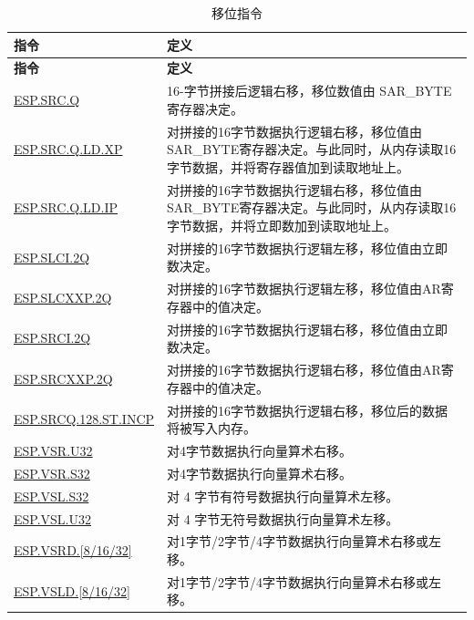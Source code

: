 \begin{longtable}[c]{|l|m{10cm}|}
    \caption{移位指令}
    \label{tab:pie-shift-instructions}\\
    \hline
    \rowcolor{lightgray}
    \textbf{指令} & \textbf{定义} \\\hline
    \endfirsthead
    \rowcolor{lightgray}
    \textbf{指令} & \textbf{定义} \\\hline
    \endhead
    \endfoot

    \hyperref[instruction:ESPSRCQ]{ESP.SRC.Q} & 16-字节拼接后逻辑右移，移位数值由 SAR\_BYTE 寄存器决定。
    \\\hline
\hyperref[instruction:ESPSRCQLDXP]{ESP.SRC.Q.LD.XP} & 对拼接的16字节数据执行逻辑右移，移位值由SAR\_BYTE寄存器决定。与此同时，从内存读取16字节数据，并将寄存器值加到读取地址上。 \\\hline
\hyperref[instruction:ESPSRCQLDIP]{ESP.SRC.Q.LD.IP} & 对拼接的16字节数据执行逻辑右移，移位值由SAR\_BYTE寄存器决定。与此同时，从内存读取16字节数据，并将立即数加到读取地址上。 \\\hline
\hyperref[instruction:ESPSLCI2Q]{ESP.SLCI.2Q} & 对拼接的16字节数据执行逻辑左移，移位值由立即数决定。 \\\hline
\hyperref[instruction:ESPSLCXXP2Q]{ESP.SLCXXP.2Q} & 对拼接的16字节数据执行逻辑左移，移位值由AR寄存器中的值决定。 \\\hline
\hyperref[instruction:ESPSRCI2Q]{ESP.SRCI.2Q} & 对拼接的16字节数据执行逻辑右移，移位值由立即数决定。 \\\hline
\hyperref[instruction:ESPSRCXXP2Q]{ESP.SRCXXP.2Q} & 对拼接的16字节数据执行逻辑右移，移位值由AR寄存器中的值决定。 \\\hline
\hyperref[instruction:ESPSRCQ128STINCP]{ESP.SRCQ.128.ST.INCP} & 对拼接的16字节数据执行逻辑右移，移位后的数据将被写入内存。 \\\hline
\hyperref[instruction:ESPVSRU32]{ESP.VSR.U32} & 对4字节数据执行向量算术右移。 \\\hline
\hyperref[instruction:ESPVSRS32]{ESP.VSR.S32} & 对4字节数据执行向量算术右移。 \\\hline
\hyperref[instruction:ESPVSLS32]{ESP.VSL.S32} & 对 4 字节有符号数据执行向量算术左移。 \\\hline
\hyperref[instruction:ESPVSLU32]{ESP.VSL.U32} & 对 4 字节无符号数据执行向量算术左移。 \\\hline
\hyperref[instruction:ESPVSrd32]{ESP.VSRD.[8/16/32]} & 对1字节/2字节/4字节数据执行向量算术右移或左移。 \\\hline
\hyperref[instruction:ESPVSLD32]{ESP.VSLD.[8/16/32]} & 对1字节/2字节/4字节数据执行向量算术右移或左移。 \\\hline

\end{longtable}